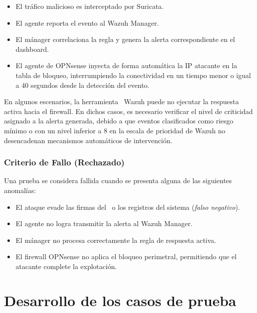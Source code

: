 \begin{itemize}
    \item El tráfico malicioso es interceptado por Suricata.
    
    \item El agente reporta el evento al Wazuh Manager.
    
    \item El mánager correlaciona la regla y genera la alerta correspondiente en el dashboard.
    
    \item El agente de OPNsense inyecta de forma automática la IP atacante en la tabla de bloqueo, interrumpiendo la conectividad en un tiempo menor o igual a 40 segundos desde la detección del evento.
\end{itemize}

En algunos escenarios, la herramienta \SIEM\ Wazuh puede no ejecutar la respuesta activa hacia el firewall. En dichos casos, es necesario 
verificar el nivel de criticidad asignado a la alerta generada, debido a que eventos clasificados como riesgo mínimo o con un nivel 
inferior a 8 en la escala de prioridad de Wazuh no desencadenan mecanismos automáticos de intervención.

\subsubsection{Criterio de Fallo (Rechazado)}

Una prueba se considera fallida cuando se presenta alguna de las siguientes anomalías:

\begin{itemize}
    \item El ataque evade las firmas del \IDS\ o los registros del sistema (\textit{falso negativo}).
    
    \item El agente no logra transmitir la alerta al Wazuh Manager.
    
    \item El mánager no procesa correctamente la regla de respuesta activa.
    
    \item El firewall OPNsense no aplica el bloqueo perimetral, permitiendo que el atacante complete la explotación.
\end{itemize}


\section{Desarrollo de los casos de prueba}
\noindent

